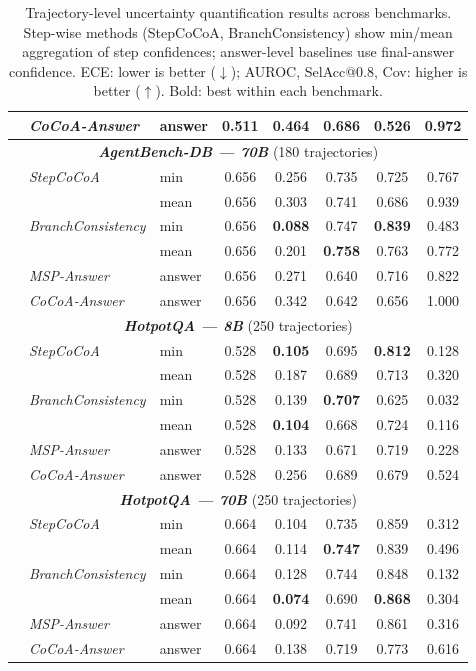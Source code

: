 \begin{table}[!h]
\begin{tabular}{lllccccc}
 & \textit{CoCoA-Answer} & answer & 0.511 & 0.464 & 0.686 & 0.526 & 0.972 \\
\midrule
\multicolumn{8}{c}{\textit{\textbf{AgentBench-DB — 70B}} (180 trajectories)} \\
\midrule
 & \textit{StepCoCoA} & min & 0.656 & 0.256 & 0.735 & 0.725 & 0.767 \\
 &  & mean & 0.656 & 0.303 & 0.741 & 0.686 & 0.939 \\
 & \textit{BranchConsistency} & min & 0.656 & \textbf{0.088} & 0.747 & \textbf{0.839} & 0.483 \\
 &  & mean & 0.656 & 0.201 & \textbf{0.758} & 0.763 & 0.772 \\
 & \textit{MSP-Answer} & answer & 0.656 & 0.271 & 0.640 & 0.716 & 0.822 \\
 & \textit{CoCoA-Answer} & answer & 0.656 & 0.342 & 0.642 & 0.656 & 1.000 \\
\midrule
\multicolumn{8}{c}{\textit{\textbf{HotpotQA — 8B}} (250 trajectories)} \\
\midrule
 & \textit{StepCoCoA} & min & 0.528 & \textbf{0.105} & 0.695 & \textbf{0.812} & 0.128 \\
 &  & mean & 0.528 & 0.187 & 0.689 & 0.713 & 0.320 \\
 & \textit{BranchConsistency} & min & 0.528 & 0.139 & \textbf{0.707} & 0.625 & 0.032 \\
 &  & mean & 0.528 & \textbf{0.104} & 0.668 & 0.724 & 0.116 \\
 & \textit{MSP-Answer} & answer & 0.528 & 0.133 & 0.671 & 0.719 & 0.228 \\
 & \textit{CoCoA-Answer} & answer & 0.528 & 0.256 & 0.689 & 0.679 & 0.524 \\
\midrule
\multicolumn{8}{c}{\textit{\textbf{HotpotQA — 70B}} (250 trajectories)} \\
\midrule
 & \textit{StepCoCoA} & min & 0.664 & 0.104 & 0.735 & 0.859 & 0.312 \\
 &  & mean & 0.664 & 0.114 & \textbf{0.747} & 0.839 & 0.496 \\
 & \textit{BranchConsistency} & min & 0.664 & 0.128 & 0.744 & 0.848 & 0.132 \\
 &  & mean & 0.664 & \textbf{0.074} & 0.690 & \textbf{0.868} & 0.304 \\
 & \textit{MSP-Answer} & answer & 0.664 & 0.092 & 0.741 & 0.861 & 0.316 \\
 & \textit{CoCoA-Answer} & answer & 0.664 & 0.138 & 0.719 & 0.773 & 0.616 \\
\bottomrule
\end{tabular}
\caption{Trajectory-level uncertainty quantification results across benchmarks. Step-wise methods (StepCoCoA, BranchConsistency) show min/mean aggregation of step confidences; answer-level baselines use final-answer confidence. ECE: lower is better ($\downarrow$); AUROC, SelAcc@0.8, Cov: higher is better ($\uparrow$). Bold: best within each benchmark.}
\label{tab:results_traj_aggregation}
\end{table}